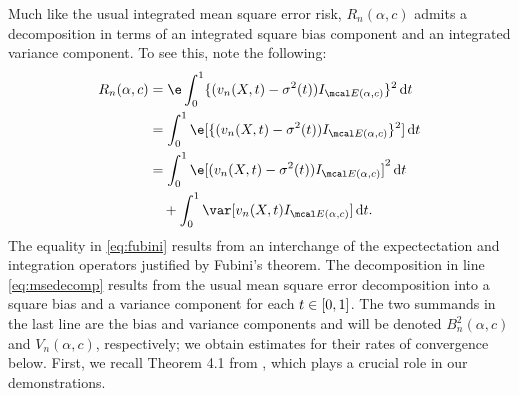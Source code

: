 Much like the usual integrated mean square error risk, $R_n(\alpha,c)$ admits a decomposition in terms of an integrated square bias component and an integrated variance component. To see this, note the following:
\begin{align}
  R_n(\alpha, c ) & = \e \int_0^1  \{(\svnx - \sigma^2(t))\indvol\}^2 \D t \\ 
  & = \int_0^1 \e[ \{(\svnx - \sigma^2(t))\indvol\}^2] \D t \label{eq:fubini}\\ 
& = \int_0^1 \e[ (\svnx - \sigma^2(t))\indvol]^2 \D t \notag \\
& \quad + \int_0^1 \var[\svnx\indvol] \D t. \label{eq:msedecomp}
\end{align}
The equality in \eqref{eq:fubini} results from an interchange of the expectectation and integration operators justified by Fubini's theorem. The decomposition in line  \eqref{eq:msedecomp} results from the usual mean square error decomposition  into a square bias and a variance component for each  $t \in [0,1]$. The two summands in the last line are the bias and variance components and will be denoted $B_n^2(\alpha,c)$ and $V_n(\alpha,c)$, respectively; we obtain estimates for their rates of convergence below. First, we recall  Theorem 4.1 from \cite{Zhang2008}, which plays a crucial role in our demonstrations. 

